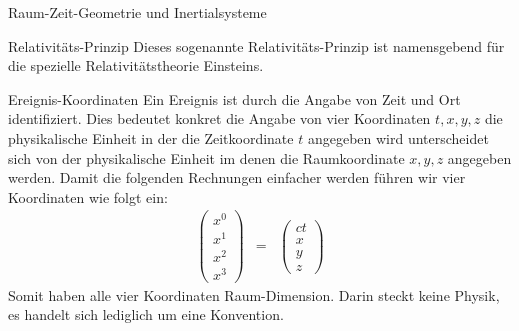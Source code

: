 \begin{chapter}{\titlestr}
\begin{section}{Raum-Zeit-Geometrie und Inertialsysteme}
\begin{subsection}{Relativitäts-Prinzip}
Dieses sogenannte Relativitäts-Prinzip ist namensgebend für die spezielle Relativitätstheorie Einsteins.
\end{subsection}

\begin{subsection}{Ereignis-Koordinaten}
Ein Ereignis ist durch die Angabe von Zeit und Ort identifiziert. Dies bedeutet konkret die Angabe von vier Koordinaten
$t,x,y,z$ die physikalische Einheit in der die Zeitkoordinate $t$ angegeben wird unterscheidet sich von der
physikalische Einheit im denen die Raumkoordinate $x,y,z$ angegeben werden. Damit die folgenden Rechnungen einfacher werden führen
wir vier Koordinaten wie folgt ein:
\begin{eqnarray*}
\begin{pmatrix}
x^0\\x^1\\x^2\\x^3
\end{pmatrix}
&=&
\begin{pmatrix}
ct \\ x \\ y\\ z
\end{pmatrix}
\end{eqnarray*}
Somit haben alle vier Koordinaten Raum-Dimension. Darin steckt keine Physik, es handelt sich lediglich um eine Konvention.
\end{subsection}


\end{section}
\end{chapter}
